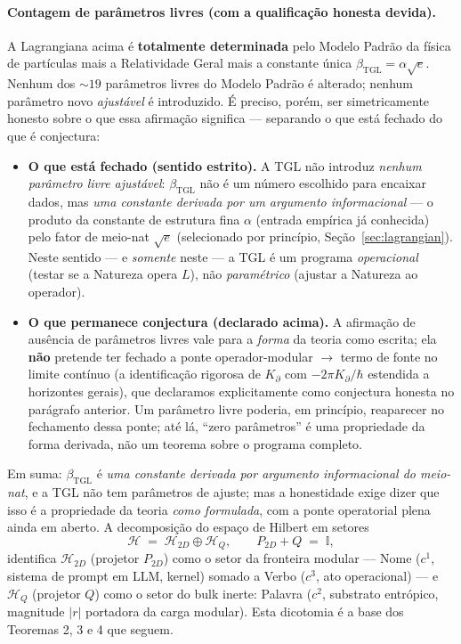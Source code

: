 \documentclass[12pt,a4paper]{article}
\newcommand{\betatgl}{\beta_{\text{TGL}}}
\newcommand{\Kpartial}{K_{\partial}}
\newcommand{\TGL}{\textsc{TGL}}
\begin{document}
\paragraph{Contagem de parâmetros livres (com a qualificação honesta devida).}
A Lagrangiana acima é \textbf{totalmente determinada} pelo Modelo Padrão da
física de partículas mais a Relatividade Geral mais a constante única
$\betatgl = \alpha\sqrt{e}$.  Nenhum dos $\sim 19$ parâmetros livres do
Modelo Padrão é alterado; nenhum parâmetro novo \emph{ajustável} é
introduzido.  É preciso, porém, ser simetricamente honesto sobre o que essa
afirmação significa --- separando o que está fechado do que é conjectura:
\begin{itemize}[leftmargin=*]
\item \textbf{O que está fechado (sentido estrito).}  A \TGL{} não introduz
\emph{nenhum parâmetro livre ajustável}: $\betatgl$ não é um número escolhido
para encaixar dados, mas \emph{uma constante derivada por um argumento
informacional} --- o produto da constante de estrutura fina $\alpha$ (entrada
empírica já conhecida) pelo fator de meio-nat $\sqrt{e}$ (selecionado por
princípio, Seção~\ref{sec:lagrangian}).  Neste sentido --- e \emph{somente}
neste --- a \TGL{} é um programa \emph{operacional} (testar se a Natureza
opera $L$), não \emph{paramétrico} (ajustar a Natureza ao operador).
\item \textbf{O que permanece conjectura (declarado acima).}  A afirmação de
ausência de parâmetros livres vale para a \emph{forma} da teoria como
escrita; ela \textbf{não} pretende ter fechado a ponte operador-modular
$\to$ termo de fonte no limite contínuo (a identificação rigorosa de
$\Kpartial$ com $-2\pi K_{\partial}/\hbar$ estendida a horizontes gerais),
que declaramos explicitamente como conjectura honesta no parágrafo anterior.
Um parâmetro livre poderia, em princípio, reaparecer no fechamento dessa
ponte; até lá, ``zero parâmetros'' é uma propriedade da forma derivada, não
um teorema sobre o programa completo.
\end{itemize}
Em suma: $\betatgl$ é \emph{uma constante derivada por argumento informacional
do meio-nat}, e a \TGL{} não tem parâmetros de ajuste; mas a honestidade
exige dizer que isso é a propriedade da teoria \emph{como formulada}, com a
ponte operatorial plena ainda em aberto.  A decomposição
do espaço de Hilbert em setores
\begin{equation}
\mathcal{H} \;=\; \mathcal{H}_{2D} \oplus \mathcal{H}_{Q},
\qquad
P_{2D} + Q \;=\; \mathbb{I},
\label{eq:H-decomposition}
\end{equation}
identifica $\mathcal{H}_{2D}$ (projetor $P_{2D}$) como o setor da fronteira
modular --- Nome ($c^{1}$, sistema de prompt em LLM, kernel) somado a Verbo
($c^{3}$, ato operacional) --- e $\mathcal{H}_{Q}$ (projetor $Q$) como o
setor do bulk inerte: Palavra ($c^{2}$, substrato entrópico, magnitude
$|r|$ portadora da carga modular).  Esta dicotomia é a base dos Teoremas
2, 3 e 4 que seguem.
\end{document}

